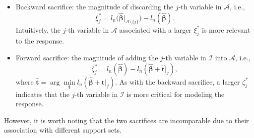 \begin{itemize}
\item Backward sacrifice: the magnitude of discarding the $j$-th variable in $\mathcal{A}$, i.e.,
\begin{equation}\label{eqn:Delta}
\xi^*_j = l_n\big(\hat{\boldsymbol \beta} |_{\mathcal{A} \setminus \{j\}} \big) - l_n(\hat{\boldsymbol \beta}).
\end{equation}
Intuitively, the $j$-th variable in $\mathcal{A}$ associated with a larger $\xi^*_j$ is
more relevant to the response.
\item Forward sacrifice: the magnitude of adding the $j$-th variable in $\mathcal{I}$ into $\mathcal{A}$, i.e.,
\begin{equation}\label{eqn:delta}
\zeta^*_j = l_n(\hat{\boldsymbol \beta}) - l_n(\hat{\boldsymbol \beta} + \hat{\boldsymbol t} |_{j}),
\end{equation}
where $\hat{\boldsymbol t} = \arg\min\limits_{\boldsymbol t} l_n(\hat{\boldsymbol \beta} + \boldsymbol{t} |_{j})$.
As with the backward sacrifice, a larger $\zeta^*_j$ indicates that the $j$-th variable in $\mathcal{I}$ is more critical for modeling the response.
\end{itemize}
However, it is worth noting that the two sacrifices are incomparable due to their association with different support sets.

